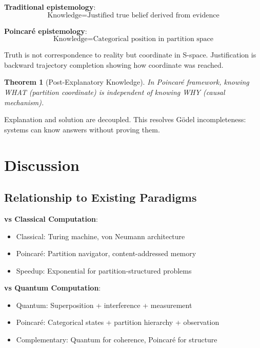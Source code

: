 \documentclass[twocolumn,10pt]{article}
\newtheorem{theorem}{Theorem}
\begin{document}
\textbf{Traditional epistemology}:
\begin{equation}
\text{Knowledge} = \text{Justified true belief derived from evidence}
\end{equation}

\textbf{Poincaré epistemology}:
\begin{equation}
\text{Knowledge} = \text{Categorical position in partition space}
\end{equation}

Truth is not correspondence to reality but coordinate in S-space. Justification is backward trajectory completion showing how coordinate was reached.

\begin{theorem}[Post-Explanatory Knowledge]
In Poincaré framework, knowing WHAT (partition coordinate) is independent of knowing WHY (causal mechanism).
\end{theorem}

Explanation and solution are decoupled. This resolves Gödel incompleteness: systems can know answers without proving them.

\section{Discussion}

\subsection{Relationship to Existing Paradigms}

\textbf{vs Classical Computation}:
\begin{itemize}
\item Classical: Turing machine, von Neumann architecture
\item Poincaré: Partition navigator, content-addressed memory
\item Speedup: Exponential for partition-structured problems
\end{itemize}

\textbf{vs Quantum Computation}:
\begin{itemize}
\item Quantum: Superposition + interference + measurement
\item Poincaré: Categorical states + partition hierarchy + observation
\item Complementary: Quantum for coherence, Poincaré for structure
\end{itemize}
\end{document}
